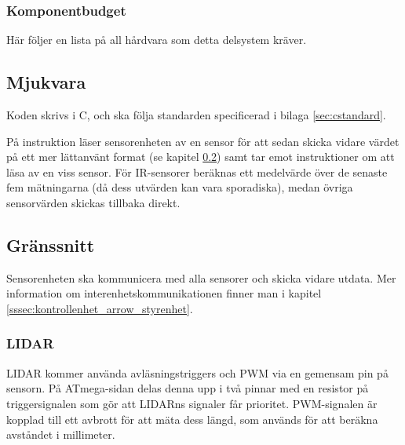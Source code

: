 \documentclass[a4paper,11pt]{article}
\begin{document}
\clearpage

\subsubsection{Komponentbudget}
Här följer en lista på all hårdvara som detta delsystem kräver.

\begin{HardwareList}
\end{HardwareList}

\subsection{Mjukvara}

Koden skrivs i C, och ska följa standarden specificerad i bilaga \ref{sec:cstandard}.

På instruktion läser sensorenheten av en sensor för att sedan skicka vidare värdet på ett mer lättanvänt format (se kapitel \ref{ssec:sensorInterface}) samt tar emot instruktioner om att läsa av en viss sensor. För IR-sensorer beräknas ett medelvärde över de senaste fem mätningarna (då dess utvärden kan vara sporadiska), medan övriga sensorvärden skickas tillbaka direkt.

\subsection{Gränssnitt} \label{ssec:sensorInterface}
Sensorenheten ska kommunicera med alla sensorer och skicka vidare utdata. Mer information om interenhetskommunikationen finner man i kapitel \ref{sssec:kontrollenhet_arrow_styrenhet}.


\subsubsection{LIDAR}
LIDAR kommer använda avläsningstriggers och PWM via en gemensam pin på sensorn. På ATmega-sidan delas denna upp i två pinnar med en resistor på triggersignalen som gör att LIDARns signaler får prioritet. PWM-signalen är kopplad till ett avbrott för att mäta dess längd, som används för att beräkna avståndet i millimeter.
\end{document}
